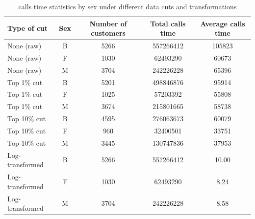\begin{table}
  \centering
  \caption{calls time statistics by sex under different data cuts and transformations}
  \label{tab:calltime_sex_cuts}
  \begin{tabularx}{.75\textwidth}{lcccc}
    \toprule
    Type of cut & Sex & Number of customers & Total calls time & Average calls time \\
    \midrule
    None (raw)      & B & 5266 & 557266412 & 105823 \\
    None (raw)      & F & 1030 &  62493290 &  60673 \\
    None (raw)      & M & 3704 & 242226228 &  65396 \\
    \midrule
    Top 1\% cut     & B & 5201 & 498846876 &  95914 \\
    Top 1\% cut     & F & 1025 &  57203392 &  55808 \\
    Top 1\% cut     & M & 3674 & 215801665 &  58738 \\
    \midrule
    Top 10\% cut    & B & 4595 & 276063673 &  60079 \\
    Top 10\% cut    & F &  960 &  32400501 &  33751 \\
    Top 10\% cut    & M & 3445 & 130747836 &  37953 \\
    \midrule
    Log-transformed & B & 5266 & 557266412 & 10.00 \\
    Log-transformed & F & 1030 &  62493290 &  8.24 \\
    Log-transformed & M & 3704 & 242226228 &  8.58 \\
    \bottomrule
  \end{tabularx}
\end{table}

